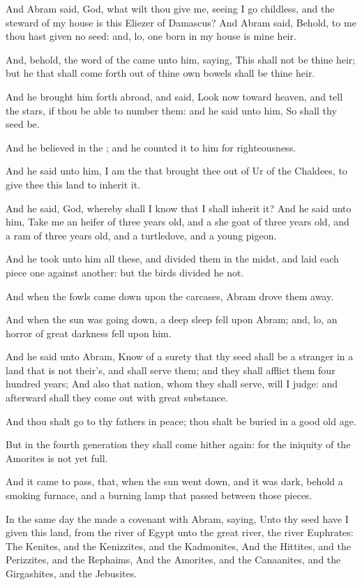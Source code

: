 \Verse And Abram said, \LORD God, what wilt thou give me, seeing I go childless, and the steward of my house is this Eliezer of Damascus?  \Verse And Abram said, Behold, to me thou hast given no seed: and, lo, one born in my house is mine heir.

\Verse And, behold, the word of the \LORD came unto him, saying, This shall not be thine heir; but he that shall come forth out of thine own bowels shall be thine heir.

\Verse And he brought him forth abroad, and said, Look now toward heaven, and tell the stars, if thou be able to number them: and he said unto him, So shall thy seed be.

\Verse And he believed in the \LORD; and he counted it to him for righteousness.

\Verse And he said unto him, I am the \LORD that brought thee out of Ur of the Chaldees, to give thee this land to inherit it.

\Verse And he said, \LORD God, whereby shall I know that I shall inherit it?  \Verse And he said unto him, Take me an heifer of three years old, and a she goat of three years old, and a ram of three years old, and a turtledove, and a young pigeon.

\Verse And he took unto him all these, and divided them in the midst, and laid each piece one against another: but the birds divided he not.

\Verse And when the fowls came down upon the carcases, Abram drove them away.

\Verse And when the sun was going down, a deep sleep fell upon Abram; and, lo, an horror of great darkness fell upon him.

\Verse And he said unto Abram, Know of a surety that thy seed shall be a stranger in a land that is not their's, and shall serve them; and they shall afflict them four hundred years; \Verse And also that nation, whom they shall serve, will I judge: and afterward shall they come out with great substance.

\Verse And thou shalt go to thy fathers in peace; thou shalt be buried in a good old age.

\Verse But in the fourth generation they shall come hither again: for the iniquity of the Amorites is not yet full.

\Verse And it came to pass, that, when the sun went down, and it was dark, behold a smoking furnace, and a burning lamp that passed between those pieces.

\Verse In the same day the \LORD made a covenant with Abram, saying, Unto thy seed have I given this land, from the river of Egypt unto the great river, the river Euphrates: \Verse The Kenites, and the Kenizzites, and the Kadmonites, \Verse And the Hittites, and the Perizzites, and the Rephaims, \Verse And the Amorites, and the Canaanites, and the Girgashites, and the Jebusites.

